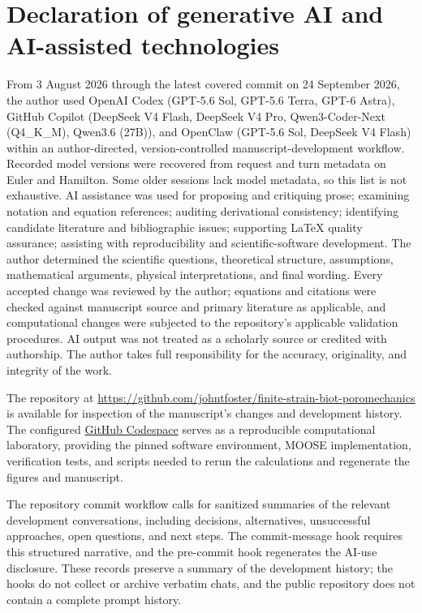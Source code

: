 \section*{Declaration of generative AI and AI-assisted technologies}

From 3 August 2026 through the latest covered commit on 24 September 2026, the author used OpenAI Codex (GPT-5.6 Sol, GPT-5.6 Terra, GPT-6 Astra), GitHub Copilot (DeepSeek V4 Flash, DeepSeek V4 Pro, Qwen3-Coder-Next (Q4\_K\_M), Qwen3.6 (27B)), and OpenClaw (GPT-5.6 Sol, DeepSeek V4 Flash) within an author-directed, version-controlled manuscript-development workflow. Recorded model versions were recovered from request and turn metadata on Euler and Hamilton. Some older sessions lack model metadata, so this list is not exhaustive. AI assistance was used for proposing and critiquing prose; examining notation and equation references; auditing derivational consistency; identifying candidate literature and bibliographic issues; supporting \LaTeX{} quality assurance; assisting with reproducibility and scientific-software development. The author determined the scientific questions, theoretical structure, assumptions, mathematical arguments, physical interpretations, and final wording. Every accepted change was reviewed by the author; equations and citations were checked against manuscript source and primary literature as applicable, and computational changes were subjected to the repository's applicable validation procedures. AI output was not treated as a scholarly source or credited with authorship. The author takes full responsibility for the accuracy, originality, and integrity of the work.

The repository at \url{https://github.com/johntfoster/finite-strain-biot-poromechanics} is available for inspection of the manuscript's changes and development history.
The configured \href{https://codespaces.new/johntfoster/finite-strain-biot-poromechanics}{GitHub Codespace} serves as a reproducible computational laboratory, providing the pinned software environment, MOOSE implementation, verification tests, and scripts needed to rerun the calculations and regenerate the figures and manuscript.

The repository commit workflow calls for sanitized summaries of the relevant development conversations, including decisions, alternatives, unsuccessful approaches, open questions, and next steps. The commit-message hook requires this structured narrative, and the pre-commit hook regenerates the AI-use disclosure. These records preserve a summary of the development history; the hooks do not collect or archive verbatim chats, and the public repository does not contain a complete prompt history.
